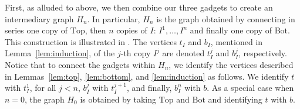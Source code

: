 \documentclass[11pt,letter]{article}
\theoremstyle{remark}
\newcommand{\T}{\text{Top}}
\newcommand{\B}{\text{Bot}}
\begin{document}
First, as alluded to above, we then combine our three gadgets to create an intermediary graph $H_n$. In particular, $H_n$ is the graph obtained by connecting in series one copy of $\T$,
then $n$ copies of $I$: $I^1, \dots, I^n$ and finally one copy of $\B$.  
This construction is illustrated in .
The vertices $t_I$ and $b_I$, mentioned in Lemma~\ref{lem:induction}, of the $j$-th copy $I^j$ are denoted $t^j_I$ and $b^j_I$, respectively.
Notice that to connect the gadgets within $H_n$, we identify the vertices described in Lemmas~\ref{lem:top}, \ref{lem:bottom}, and \ref{lem:induction} as follows. We identify $t$ with $t^1_I$, for all $j < n$, $b^j_I$ with $t^{j+1}_I$, and finally, $b^n_I$ with $b$. As a special case when $n = 0$, the graph $H_0$ is obtained by taking $\T$ and $\B$ and identifying $t$ with $b$.
\end{document}
